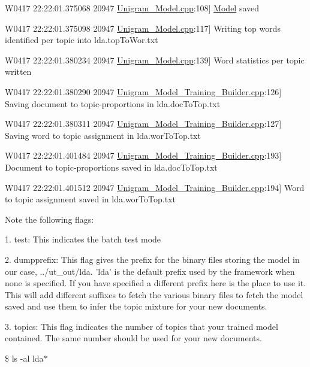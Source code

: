 {\ttfamily W0417 22:22:01.375068 20947 \hyperlink{_unigram___model_8cpp}{Unigram\_\-Model.cpp}:108\mbox{]} \hyperlink{class_model}{Model} saved  }

{\ttfamily W0417 22:22:01.375098 20947 \hyperlink{_unigram___model_8cpp}{Unigram\_\-Model.cpp}:117\mbox{]} Writing top words identified per topic into lda.topToWor.txt  }

{\ttfamily W0417 22:22:01.380234 20947 \hyperlink{_unigram___model_8cpp}{Unigram\_\-Model.cpp}:139\mbox{]} Word statistics per topic written  }

{\ttfamily W0417 22:22:01.380290 20947 \hyperlink{_unigram___model___training___builder_8cpp}{Unigram\_\-Model\_\-Training\_\-Builder.cpp}:126\mbox{]} Saving document to topic-\/proportions in lda.docToTop.txt  }

{\ttfamily W0417 22:22:01.380311 20947 \hyperlink{_unigram___model___training___builder_8cpp}{Unigram\_\-Model\_\-Training\_\-Builder.cpp}:127\mbox{]} Saving word to topic assignment in lda.worToTop.txt  }

{\ttfamily W0417 22:22:01.401484 20947 \hyperlink{_unigram___model___training___builder_8cpp}{Unigram\_\-Model\_\-Training\_\-Builder.cpp}:193\mbox{]} Document to topic-\/proportions saved in lda.docToTop.txt  }

{\ttfamily W0417 22:22:01.401512 20947 \hyperlink{_unigram___model___training___builder_8cpp}{Unigram\_\-Model\_\-Training\_\-Builder.cpp}:194\mbox{]} Word to topic assignment saved in lda.worToTop.txt  } 

\par
  

Note the following flags: 

1. test: This indicates the batch test mode 

2. dumpprefix: This flag gives the prefix for the binary files storing the model in our case, ../ut\_\-out/lda. 'lda' is the default prefix used by the framework when none is specified. If you have specified a different prefix here is the place to use it. This will add different suffixes to fetch the various binary files to fetch the model saved and use them to infer the topic mixture for your new documents. 

3. topics: This flag indicates the number of topics that your trained model contained. The same number should be used for your new documents. 

\par
  {\ttfamily  }

{\ttfamily \$ ls -\/al lda$\ast$ }

